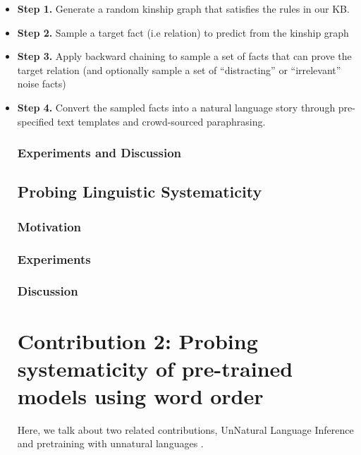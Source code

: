 \documentclass[12pt]{article}
\begin{document}
\begin{itemize}
        \item \textbf{Step 1.} Generate a random kinship graph that satisfies the rules in our KB.
        \item \textbf{Step 2.} Sample a target fact (i.e relation) to predict from the kinship graph
        \item \textbf{Step 3.} Apply backward chaining to sample a set of facts that can prove the target relation (and optionally sample a set of ``distracting'' or ``irrelevant'' noise facts)
        \item \textbf{Step 4.} Convert the sampled facts into a natural language story through pre-specified text templates and crowd-sourced paraphrasing.

\subsubsection{Experiments and Discussion}

\subsection{Probing Linguistic Systematicity}

\subsubsection{Motivation}

\subsubsection{Experiments}

\subsubsection{Discussion}


\section{Contribution 2: Probing systematicity of pre-trained models using word order}
\label{sec:cont2}


Here, we talk about two related contributions, UnNatural Language Inference \cite{sinha2021} and pretraining with unnatural languages \cite{sinha2021a}.


\end{itemize}
\end{document}
